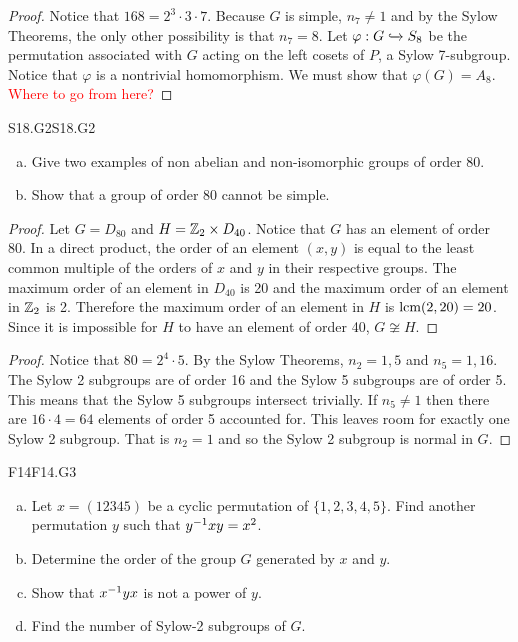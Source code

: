 \documentclass[../AlgebraQualSolutions.tex]{subfiles}
\begin{document}
	\begin{proof}
		Notice that $168 = 2^3\cdot3\cdot7$. Because $G$ is simple, $n_7 \neq 1$ and by the Sylow Theorems, the only other possibility is that $n_7 = 8$. Let $\varphi: G \xhookrightarrow{} S_8$ be the permutation associated with $G$ acting on the left cosets of $P$, a Sylow 7-subgroup. Notice that $\varphi$ is a nontrivial homomorphism. We must show that $\varphi(G) = A_8$. \textcolor{red}{Where to go from here?}
	\end{proof}

	\begin{prob}{S18.G2}{S18.G2}
		\begin{enumerate}[(a)]
			\item Give two examples of non abelian and non-isomorphic groups of order 80.
			\item Show that a group of order 80 cannot be simple.
		\end{enumerate}
	\end{prob}

	\begin{proof}
		Let $G = D_{80}$ and $H = \mathbb{Z}_2 \times D_{40}$. Notice that $G$ has an element of order 80. In a direct product, the order of an element $(x,y)$ is equal to the least common multiple of the orders of $x$ and $y$ in their respective groups. The maximum order of an element in $D_{40}$ is 20 and the maximum order of an element in $\mathbb{Z}_2$ is 2. Therefore the maximum order of an element in $H$ is $\textrm{lcm}(2,20) = 20$. Since it is impossible for $H$ to have an element of order 40, $G \not\cong H$.
	\end{proof}

	\begin{proof}
		Notice that $80 = 2^4 \cdot 5$. By the Sylow Theorems, $n_2 = 1, 5$ and $n_5 = 1,16$. The Sylow 2 subgroups are of order 16 and the Sylow 5 subgroups are of order 5. This means that the Sylow 5 subgroups intersect trivially. If $n_5 \neq 1$ then there are $16 \cdot 4 = 64$ elements of order 5 accounted for. This leaves room for exactly one Sylow 2 subgroup. That is $n_2 = 1$ and so the Sylow 2 subgroup is normal in $G$.
	\end{proof}

	\begin{prob}{F14}{F14.G3}
		\begin{enumerate}[(a)]
			\item Let $x = (12345)$ be a cyclic permutation of $\{1,2,3,4,5\}$. Find another permutation $y$ such that $y^{-1} xy = x^2$.
			\item Determine the order of the group $G$ generated by $x$ and $y$.
			\item Show that $x^{-1} y x$ is not a power of $y$.
			\item Find the number of Sylow-2 subgroups of $G$.
		\end{enumerate}
	\end{prob}
\end{document}
